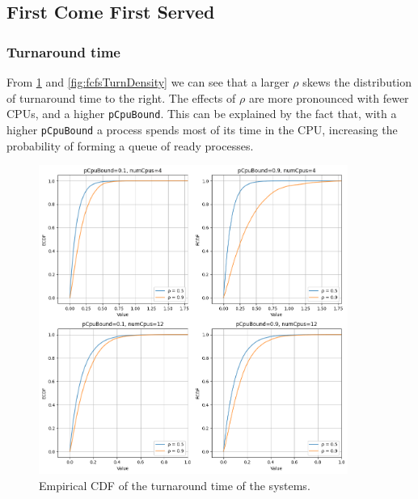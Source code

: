 
\subsection{First Come First Served}

\subsubsection{Turnaround time}

From \cref{fig:fcfsTurnEcdf} and \cref{fig:fcfsTurnDensity} we can see that a larger $\rho$ skews the distribution of turnaround time to the right. The effects of $\rho$ are more pronounced with fewer CPUs, and a higher \texttt{pCpuBound}. This can be explained by the fact that, with a higher \texttt{pCpuBound} a process spends most of its time in the CPU, increasing the probability of forming a queue of ready processes.  

\begin{figure}[H]
    \captionsetup{type=figure}
    \centering
    \includegraphics[width=0.9\textwidth]{./images/04/fcfs/turn/ecdf.png}
    \caption{Empirical CDF of the turnaround time of the systems.}
    \label{fig:fcfsTurnEcdf}
\end{figure}

